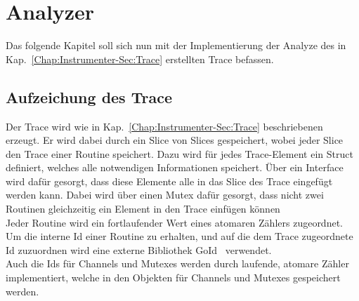 
\chapter{Analyzer} \label{Chap:Implement}

Das folgende Kapitel soll sich nun mit der Implementierung der Analyze des in 
Kap.~\ref{Chap:Instrumenter-Sec:Trace} erstellten 
Trace befassen.

\section{Aufzeichung des Trace}
Der Trace wird wie in Kap.~\ref{Chap:Instrumenter-Sec:Trace}
beschriebenen erzeugt. Er wird dabei durch ein Slice von Slices 
gespeichert, wobei jeder Slice den Trace einer Routine 
speichert. Dazu wird für jedes Trace-Element ein Struct definiert, 
welches alle notwendigen Informationen speichert. Über ein Interface 
wird dafür gesorgt, dass diese Elemente alle in das Slice des Trace eingefügt
werden kann. Dabei wird über einen Mutex dafür gesorgt, dass nicht 
zwei Routinen gleichzeitig ein Element in den Trace einfügen können\\
Jeder Routine wird ein fortlaufender Wert eines atomaren Zählers zugeordnet. 
Um die interne Id einer Routine zu erhalten, und auf die dem Trace zugeordnete 
Id zuzuordnen wird eine externe Bibliothek GoId~\cite{goid} verwendet.\\
Auch die Ids für Channels und Mutexes werden durch laufende, atomare Zähler 
implementiert, welche in den Objekten für Channels und Mutexes gespeichert werden.

